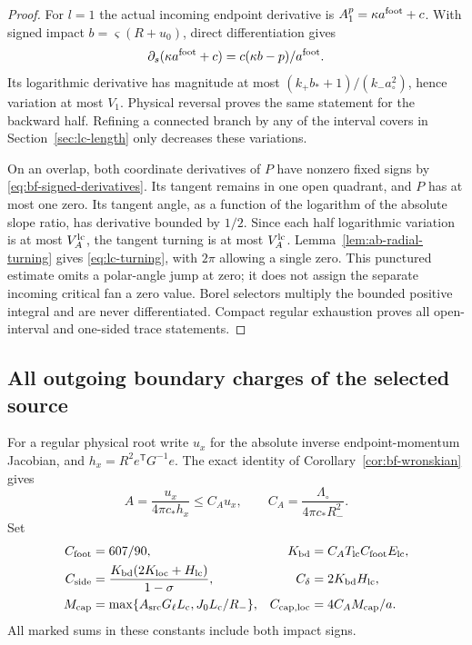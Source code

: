\begin{proof}
For $l=1$ the actual incoming endpoint derivative is
$A_1^p=\kappa a^{\rm foot}+c$.  With signed impact
$b=\varsigma(R+u_0)$, direct differentiation gives
\[
 \partial_s(\kappa a^{\rm foot}+c)
                 =c(\kappa b-p)/a^{\rm foot}.
\]
Its logarithmic derivative has magnitude at most
$(k_+b_*+1)/(k_-a_\circ^2)$, hence variation at most $V_1$.
Physical reversal proves the same statement for the backward half.
Refining a connected branch by any of the interval covers in
Section~\ref{sec:lc-length} only decreases these variations.

On an overlap, both coordinate derivatives of $P$ have nonzero
fixed signs by \eqref{eq:bf-signed-derivatives}.  Its tangent remains
in one open quadrant, and $P$ has at most one zero.  Its tangent
angle, as a function of the logarithm of the absolute slope ratio,
has derivative bounded by $1/2$.  Since each half logarithmic
variation is at most $V_A^{\rm lc}$, the tangent turning is at
most $V_A^{\rm lc}$.  Lemma~\ref{lem:ab-radial-turning} gives
\eqref{eq:lc-turning}, with $2\pi$ allowing a single zero.  This
punctured estimate omits a polar-angle jump at zero; it does not
assign the separate incoming critical fan a zero value.  Borel
selectors multiply the bounded positive integral and are never
differentiated.  Compact regular exhaustion proves all open-interval
and one-sided trace statements.
\end{proof}

\subsection{All outgoing boundary charges of the selected source}

For a regular physical root write $u_x$ for the absolute inverse
endpoint-momentum Jacobian, and $h_x=R^2e^{\mathsf T}G^{-1}e$.
The exact identity of Corollary~\ref{cor:bf-wronskian} gives
\begin{equation}\label{eq:lc-boundary-density}
 A=\frac{u_x}{4\pi c_*h_x}\le C_Au_x,\qquad
 C_A=\frac{\Lambda_\circ}{4\pi c_*R_-^2}.
\end{equation}
Set
\begin{align}
 C_{\rm foot}&=607/90,&
 K_{\rm bd}&=C_AT_{\rm lc}C_{\rm foot}E_{\rm lc},\notag\\
 C_{\rm side}&=\frac{K_{\rm bd}(2K_{\rm loc}+H_{\rm lc})}
                         {1-\sigma},&
 C_{\delta}&=2K_{\rm bd}H_{\rm lc},\notag\\
 M_{\rm cap}&=\max\{A_{\rm src}G_\ell L_{\rm c},
                                      J_0L_{\rm c}/R_-\},&
 C_{\rm cap,loc}&=4C_AM_{\rm cap}/a.
                                                   \label{eq:lc-boundary-constants}
\end{align}
All marked sums in these constants include both impact signs.

